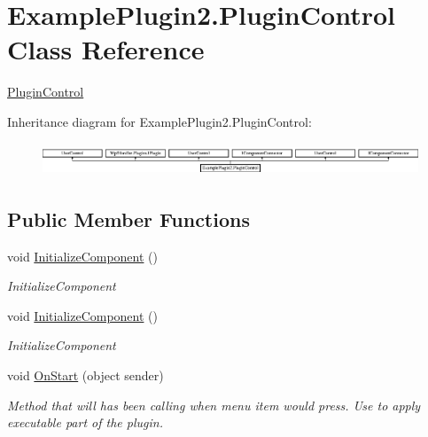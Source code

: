 \hypertarget{class_example_plugin2_1_1_plugin_control}{}\section{Example\+Plugin2.\+Plugin\+Control Class Reference}
\label{class_example_plugin2_1_1_plugin_control}


\mbox{\hyperlink{class_example_plugin2_1_1_plugin_control}{Plugin\+Control}}  


Inheritance diagram for Example\+Plugin2.\+Plugin\+Control\+:\begin{figure}[H]
\begin{center}
\leavevmode
\includegraphics[height=0.987654cm]{d5/d91/class_example_plugin2_1_1_plugin_control}
\end{center}
\end{figure}
\subsection*{Public Member Functions}
\begin{DoxyCompactItemize}
\item 
void \mbox{\hyperlink{class_example_plugin2_1_1_plugin_control_a0aac4f6241024d8f35640d996ea9f267}{Initialize\+Component}} ()
\begin{DoxyCompactList}\small\item\em Initialize\+Component \end{DoxyCompactList}\item 
void \mbox{\hyperlink{class_example_plugin2_1_1_plugin_control_a0aac4f6241024d8f35640d996ea9f267}{Initialize\+Component}} ()
\begin{DoxyCompactList}\small\item\em Initialize\+Component \end{DoxyCompactList}\item 
void \mbox{\hyperlink{class_example_plugin2_1_1_plugin_control_a3a3b3406710b512c912af0241d7a3229}{On\+Start}} (object sender)
\begin{DoxyCompactList}\small\item\em Method that will has been calling when menu item would press. Use to apply executable part of the plugin. \end{DoxyCompactList}\end{DoxyCompactItemize}
